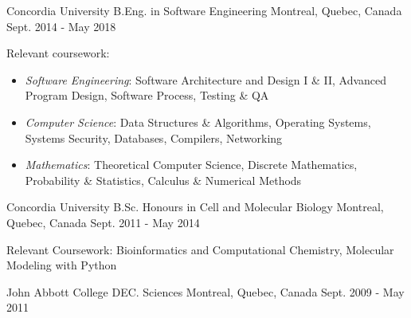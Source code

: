 

\begin{cventries}

  \cventry
  {\small Concordia University} %
  {\normalsize B.Eng. in Software Engineering} %
  {\small Montreal, Quebec, Canada} %
  {\small Sept. 2014 - May 2018} %
  {
    \begin{cvitems} %
    \item {\small Relevant coursework:}
      \begin{itemize}
        \item \small \textit{Software Engineering}: Software Architecture and Design I \& II, Advanced Program Design, Software Process, Testing \& QA
        \item \small \textit{Computer Science}: Data Structures \& Algorithms, Operating Systems, Systems Security, Databases, Compilers, Networking
        \item \small \textit{Mathematics}: Theoretical Computer Science, Discrete Mathematics, Probability \& Statistics, Calculus \& Numerical Methods
    \end{itemize}
    \end{cvitems}
  }

  \cventry
  {\small Concordia University} %
  {\normalsize B.Sc. Honours in Cell and Molecular Biology} %
  {\small Montreal, Quebec, Canada} %
  {\small Sept. 2011 - May 2014} %
  {
    \begin{cvitems} %
    \item {\small Relevant Coursework: Bioinformatics and Computational Chemistry, Molecular Modeling with Python }
    \end{cvitems}
  }

  \cventry
  {\small John Abbott College} %
  {\normalsize DEC. Sciences} %
  {\small Montreal, Quebec, Canada} %
  {\small Sept. 2009 - May 2011} %
  {
  }


\end{cventries}
